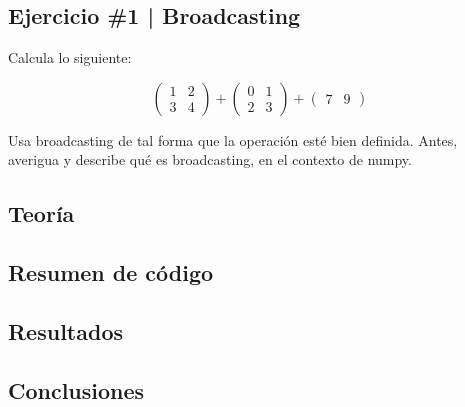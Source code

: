 \newpage

\begin{myblock}
\section*{Ejercicio \#1 | Broadcasting}

Calcula lo siguiente:

\[
    \begin{pmatrix} 1 & 2 \\ 3 & 4 \end{pmatrix} + 
    \begin{pmatrix} 0 & 1 \\ 2 & 3 \end{pmatrix} + 
    \begin{pmatrix} 7 & 9 \end{pmatrix}
\]

Usa broadcasting de tal forma que la operación esté bien definida. Antes, 
averigua y describe qué es broadcasting, en el contexto de numpy. 

\end{myblock}



\subsection{Teoría}

\subsection{Resumen de código}

\subsection{Resultados}

\subsection{Conclusiones}

\clearpage





















